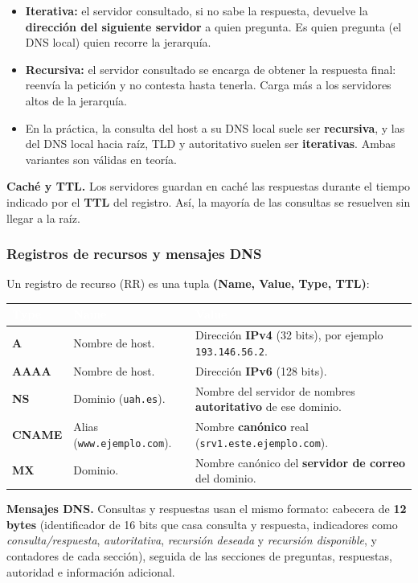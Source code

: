 \documentclass[11pt,a4paper]{article}
\newcommand{\hd}[1]{\cellcolor{uahblue}\textcolor{white}{\textbf{#1}}}
\begin{document}
\begin{itemize}
  \item \textbf{Iterativa:} el servidor consultado, si no sabe la respuesta, devuelve la \textbf{dirección del siguiente servidor} a quien pregunta. Es quien pregunta (el DNS local) quien recorre la jerarquía.
  \item \textbf{Recursiva:} el servidor consultado se encarga de obtener la respuesta final: reenvía la petición y no contesta hasta tenerla. Carga más a los servidores altos de la jerarquía.
  \item En la práctica, la consulta del host a su DNS local suele ser \textbf{recursiva}, y las del DNS local hacia raíz, TLD y autoritativo suelen ser \textbf{iterativas}. Ambas variantes son válidas en teoría.
\end{itemize}

\textbf{Caché y TTL.} Los servidores guardan en caché las respuestas durante el tiempo indicado por el \textbf{TTL} del registro. Así, la mayoría de las consultas se resuelven sin llegar a la raíz.

\subsubsection{Registros de recursos y mensajes DNS}

Un registro de recurso (RR) es una tupla \textbf{(Name, Value, Type, TTL)}:

\begin{tabularx}{\textwidth}{@{}L{1.9cm}L{4.4cm}X@{}}
\toprule
\hd{Type} & \hd{Name} & \hd{Value} \\
\midrule
\textbf{A} & Nombre de host. & Dirección \textbf{IPv4} (32 bits), por ejemplo \texttt{193.146.56.2}. \\
\textbf{AAAA} & Nombre de host. & Dirección \textbf{IPv6} (128 bits). \\
\textbf{NS} & Dominio (\texttt{uah.es}). & Nombre del servidor de nombres \textbf{autoritativo} de ese dominio. \\
\textbf{CNAME} & Alias (\texttt{www.ejemplo.com}). & Nombre \textbf{canónico} real (\texttt{srv1.este.ejemplo.com}). \\
\textbf{MX} & Dominio. & Nombre canónico del \textbf{servidor de correo} del dominio. \\
\bottomrule
\end{tabularx}

\textbf{Mensajes DNS.} Consultas y respuestas usan el mismo formato: cabecera de \textbf{12 bytes} (identificador de 16 bits que casa consulta y respuesta, indicadores como \emph{consulta/respuesta}, \emph{autoritativa}, \emph{recursión deseada} y \emph{recursión disponible}, y contadores de cada sección), seguida de las secciones de preguntas, respuestas, autoridad e información adicional.
\end{document}
